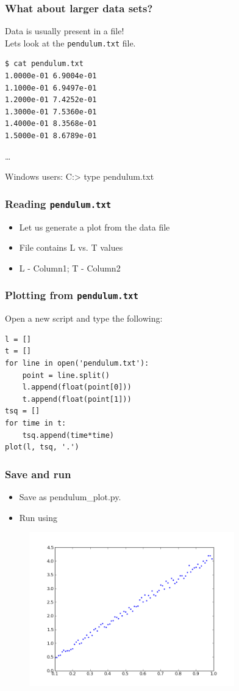 \documentclass[14pt,compress]{beamer}
\newcounter{time}
\newcommand{\typ}[1]{\lstinline{#1}}
\newcommand{\kwrd}[1]{ \texttt{\textbf{\color{blue}{#1}}}  }
\begin{document}
\begin{frame}[fragile]
\frametitle{What about larger data sets?}
\alert{Data is usually present in a file!} \\
Lets look at the \typ{pendulum.txt} file.
\begin{lstlisting} 
$ cat pendulum.txt 
1.0000e-01 6.9004e-01
1.1000e-01 6.9497e-01
1.2000e-01 7.4252e-01
1.3000e-01 7.5360e-01
1.4000e-01 8.3568e-01
1.5000e-01 8.6789e-01
\end{lstlisting}  %
\ldots
\begin{block}{Windows users:}
  C:> type pendulum.txt
\end{block}
\end{frame}

\begin{frame}[fragile]
\frametitle{Reading \typ{pendulum.txt}}
\begin{itemize}
  \item Let us generate a plot from the data file
  \item File contains L vs. T values 
  \item L - Column1; T - Column2
\end{itemize}
\end{frame}

\begin{frame}[fragile]
\frametitle{Plotting from \typ{pendulum.txt}}
Open a new script and type the following:
\begin{lstlisting}
l = []
t = []
for line in open('pendulum.txt'):
    point = line.split()
    l.append(float(point[0]))
    t.append(float(point[1]))
tsq = []
for time in t:
    tsq.append(time*time)
plot(l, tsq, '.')
\end{lstlisting}
\end{frame}

\begin{frame}
\frametitle{Save and run}
\begin{itemize}
  \item Save as pendulum\_plot.py.
  \item Run using \kwrd{\%run -i pendulum\_plot.py}
\end{itemize}
\end{frame}

\begin{frame}[fragile]
\begin{figure}
\includegraphics[width=3.5in]{data/L-Tsq.png}
\end{figure}
\end{frame}
\end{document}
